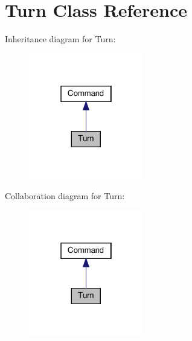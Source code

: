 \hypertarget{classTurn}{}\section{Turn Class Reference}
\label{classTurn}


Inheritance diagram for Turn\+:
\nopagebreak
\begin{figure}[H]
\begin{center}
\leavevmode
\includegraphics[width=142pt]{classTurn__inherit__graph}
\end{center}
\end{figure}


Collaboration diagram for Turn\+:
\nopagebreak
\begin{figure}[H]
\begin{center}
\leavevmode
\includegraphics[width=142pt]{classTurn__coll__graph}
\end{center}
\end{figure}
